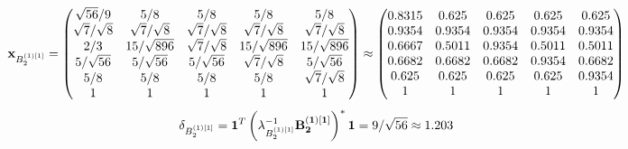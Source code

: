 \documentclass[10pt,a4paper]{article}
\begin{document}
	\[
		\bold{x}_{B_2^{(1)[1]}} = 
		\begin{pmatrix}
			{\sqrt{56}} / {{9}} & {{5}} / {{8}} & {{5}} / {{8}} & {{5}} / {{8}} & {{5}} / {{8}} \\
			{\sqrt{7}} / {\sqrt{8}} & {\sqrt{7}} / {\sqrt{8}} & {\sqrt{7}} / {\sqrt{8}} & {\sqrt{7}} / {\sqrt{8}} & {\sqrt{7}} / {\sqrt{8}} \\
			{{2}} / {{3}} & {{15}} / {\sqrt{896}} & {\sqrt{7}} / {\sqrt{8}} & {{15}} / {\sqrt{896}} & {{15}} / {\sqrt{896}} \\
			{{5}} / {\sqrt{56}} & {{5}} / {\sqrt{56}} & {{5}} / {\sqrt{56}} & {\sqrt{7}} / {\sqrt{8}} & {{5}} / {\sqrt{56}} \\
			{{5}} / {{8}} & {{5}} / {{8}} & {{5}} / {{8}} & {{5}} / {{8}} & {\sqrt{7}} / {\sqrt{8}} \\
			{1}{} & {1}{} & {1}{} & {1}{} & {1}{} \\
		\end{pmatrix}
		\approx
		\begin{pmatrix}
			0.8315   & 0.625    & 0.625    & 0.625    & 0.625    \\
			0.9354   & 0.9354   & 0.9354   & 0.9354   & 0.9354   \\
			0.6667   & 0.5011   & 0.9354   & 0.5011   & 0.5011   \\
			0.6682   & 0.6682   & 0.6682   & 0.9354   & 0.6682   \\
			0.625    & 0.625    & 0.625    & 0.625    & 0.9354   \\
			1        & 1        & 1        & 1        & 1        \\
		\end{pmatrix}
	\]
	\[
		\delta_{B_2^{(1)[1]}} = \bold{1}^T \left(\lambda_{B_2^{(1)[1]}}^{-1}\bold{B_2^{(1)[1]}}\right)^* \bold{1} = {{9}} / {\sqrt{56}}\approx 1.203
	\]
\end{document}
